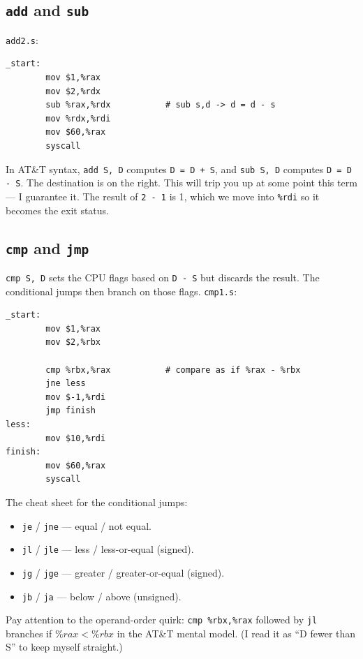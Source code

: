\documentclass[11pt]{article}
\begin{document}
\subsection*{\texttt{add} and \texttt{sub}}

\texttt{add2.s}:

\begin{lstlisting}
_start:
        mov $1,%rax
        mov $2,%rdx
        sub %rax,%rdx           # sub s,d -> d = d - s
        mov %rdx,%rdi
        mov $60,%rax
        syscall
\end{lstlisting}

In AT\&T syntax, \texttt{add S, D} computes \texttt{D = D + S}, and
\texttt{sub S, D} computes \texttt{D = D - S}. The destination is on
the right. This will trip you up at some point this term --- I
guarantee it. The result of \texttt{2 - 1} is 1, which we move into
\texttt{\%rdi} so it becomes the exit status.

\subsection*{\texttt{cmp} and \texttt{jmp}}

\texttt{cmp S, D} sets the CPU flags based on \texttt{D - S} but
discards the result. The conditional jumps then branch on those
flags. \texttt{cmp1.s}:

\begin{lstlisting}
_start:
        mov $1,%rax
        mov $2,%rbx

        cmp %rbx,%rax           # compare as if %rax - %rbx
        jne less
        mov $-1,%rdi
        jmp finish
less:
        mov $10,%rdi
finish:
        mov $60,%rax
        syscall
\end{lstlisting}

The cheat sheet for the conditional jumps:
\begin{itemize}
  \item \texttt{je} / \texttt{jne} --- equal / not equal.
  \item \texttt{jl} / \texttt{jle} --- less / less-or-equal (signed).
  \item \texttt{jg} / \texttt{jge} --- greater / greater-or-equal
    (signed).
  \item \texttt{jb} / \texttt{ja} --- below / above (unsigned).
\end{itemize}
Pay attention to the operand-order quirk: \texttt{cmp \%rbx,\%rax}
followed by \texttt{jl} branches if $\%rax < \%rbx$ in the AT\&T
mental model. (I read it as ``D fewer than S'' to keep myself
straight.)
\end{document}

